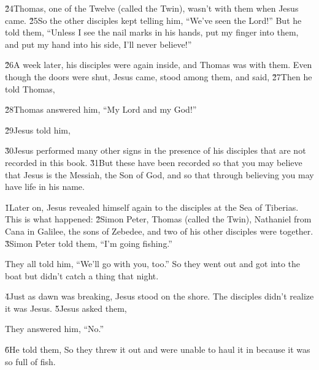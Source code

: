 \v{24}Thomas, one of the Twelve (called the Twin), wasn't with them when Jesus came. \v{25}So the other disciples kept telling him, ``We've seen the Lord!'' But he told them, ``Unless I see the nail marks in his hands, put my finger into them, and put my hand into his side, I'll never believe!''

\v{26}A week later, his disciples were again inside, and Thomas was with them. Even though the doors were shut, Jesus came, stood among them, and said,  \v{27}Then he told Thomas, 

\v{28}Thomas answered him, ``My Lord and my God!''

\v{29}Jesus told him, 

\v{30}Jesus performed many other signs in the presence of his disciples that are not recorded in this book. \v{31}But these have been recorded so that you may believe that Jesus is the Messiah, the Son of God, and so that through believing you may have life in his name.

\v{1}Later on, Jesus revealed himself again to the disciples at the Sea of Tiberias. This is what happened: \v{2}Simon Peter, Thomas (called the Twin), Nathaniel from Cana in Galilee, the sons of Zebedee, and two of his other disciples were together. \v{3}Simon Peter told them, ``I'm going fishing.''

They all told him, ``We'll go with you, too.'' So they went out and got into the boat but didn't catch a thing that night.

\v{4}Just as dawn was breaking, Jesus stood on the shore. The disciples didn't realize it was Jesus. \v{5}Jesus asked them, 

They answered him, ``No.''

\v{6}He told them,   So they threw it out and were unable to haul it in because it was so full of fish.

